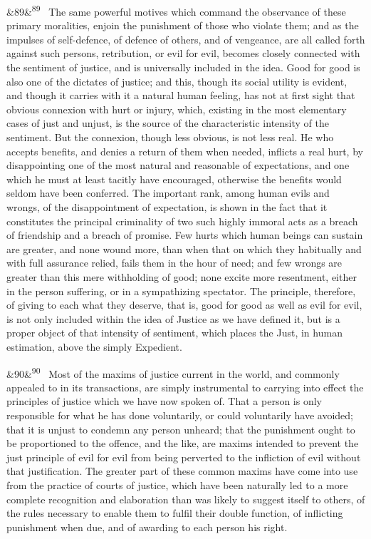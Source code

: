 \documentclass[12pt]{article}
\newcommand{\para}[1][]{\par\noindent\ifx&#1&\else\textsuperscript{\footnotesize #1}~\fi}
\begin{document}
\para[89] The same powerful motives which command the observance of these primary moralities, enjoin the punishment of those who violate them; and as the impulses of self-defence, of defence of others, and of vengeance, are all called forth against such persons, retribution, or evil for evil, becomes closely connected with the sentiment of justice, and is universally included in the idea. Good for good is also one of the dictates of justice; and this, though its social utility is evident, and though it carries with it a natural human feeling, has not at first sight that obvious connexion with hurt or injury, which, existing in the most elementary cases of just and unjust, is the source of the characteristic intensity of the sentiment. But the connexion, though less obvious, is not less real. He who accepts benefits, and denies a return of them when needed, inflicts a real hurt, by disappointing one of the most natural and reasonable of expectations, and one which he must at least tacitly have encouraged, otherwise the benefits would seldom have been conferred. The important rank, among human evils and wrongs, of the disappointment of expectation, is shown in the fact that it constitutes the principal criminality of two such highly immoral acts as a breach of friendship and a breach of promise. Few hurts which human beings can sustain are greater, and none wound more, than when that on which they habitually and with full assurance relied, fails them in the hour of need; and few wrongs are greater than this mere withholding of good; none excite more resentment, either in the person suffering, or in a sympathizing spectator. The principle, therefore, of giving to each what they deserve, that is, good for good as well as evil for evil, is not only included within the idea of Justice as we have defined it, but is a proper object of that intensity of sentiment, which places the Just, in human estimation, above the simply Expedient.

\para[90] Most of the maxims of justice current in the world, and commonly appealed to in its transactions, are simply instrumental to carrying into effect the principles of justice which we have now spoken of. That a person is only responsible for what he has done voluntarily, or could voluntarily have avoided; that it is unjust to condemn any person unheard; that the punishment ought to be proportioned to the offence, and the like, are maxims intended to prevent the just principle of evil for evil from being perverted to the infliction of evil without that justification. The greater part of these common maxims have come into use from the practice of courts of justice, which have been naturally led to a more complete recognition and elaboration than was likely to suggest itself to others, of the rules necessary to enable them to fulfil their double function, of inflicting punishment when due, and of awarding to each person his right.
\end{document}
